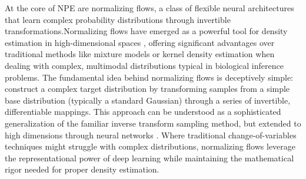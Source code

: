 \documentclass{article}
\begin{document}
At the core of NPE are normalizing flows, a class of flexible neural architectures that learn complex probability distributions through invertible transformations.Normalizing flows have emerged as a powerful tool for density estimation in high-dimensional spaces \cite{rezende2015variational, papamakarios2021normalizing}, offering significant advantages over traditional methods like mixture models or kernel density estimation when dealing with complex, multimodal distributions typical in biological inference problems. The fundamental idea behind normalizing flows is deceptively simple: construct a complex target distribution by transforming samples from a simple base distribution (typically a standard Gaussian) through a series of invertible, differentiable mappings. This approach can be understood as a sophisticated generalization of the familiar inverse transform sampling method, but extended to high dimensions through neural networks \cite{kobyzev2020normalizing}. Where traditional change-of-variables techniques might struggle with complex distributions, normalizing flows leverage the representational power of deep learning while maintaining the mathematical rigor needed for proper density estimation.
\end{document}
